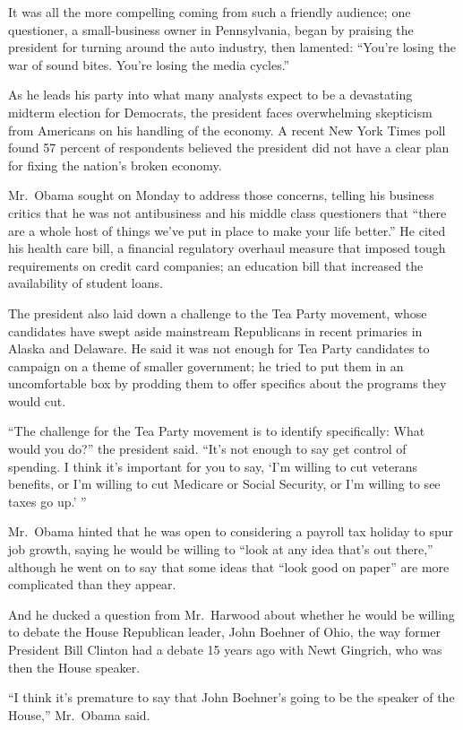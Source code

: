 ﻿\documentclass[12pt]{article}
\begin{document}
It was all the more compelling coming from such a friendly audience; one questioner, a
small-business owner in Pennsylvania, began by praising the president for turning around the auto
industry, then lamented: ``You're losing the war of sound bites. You're losing the media cycles.''

As he leads his party into what many analysts expect to be a devastating midterm election for
Democrats, the president faces overwhelming skepticism from Americans on his handling of the
economy. A recent New York Times poll found 57 percent of respondents believed the president did not
have a clear plan for fixing the nation's broken economy.

Mr.~Obama sought on Monday to address those concerns, telling his business critics that he was not
antibusiness and his middle class questioners that ``there are a whole host of things we've put in
place to make your life better.'' He cited his health care bill, a financial regulatory overhaul
measure that imposed tough requirements on credit card companies; an education bill that increased
the availability of student loans.

The president also laid down a challenge to the Tea Party movement, whose candidates have swept
aside mainstream Republicans in recent primaries in Alaska and Delaware. He said it was not enough
for Tea Party candidates to campaign on a theme of smaller government; he tried to put them in an
uncomfortable box by prodding them to offer specifics about the programs they would cut.

``The challenge for the Tea Party movement is to identify specifically: What would you do?'' the
president said. ``It's not enough to say get control of spending. I think it's important for you to
say, `I'm willing to cut veterans benefits, or I'm willing to cut Medicare or Social Security, or
I'm willing to see taxes go up.' ''

Mr.~Obama hinted that he was open to considering a payroll tax holiday to spur job growth, saying he
would be willing to ``look at any idea that's out there,'' although he went on to say that some
ideas that ``look good on paper'' are more complicated than they appear.

And he ducked a question from Mr.~Harwood about whether he would be willing to debate the House
Republican leader, John Boehner of Ohio, the way former President Bill Clinton had a debate 15 years
ago with Newt Gingrich, who was then the House speaker.

``I think it's premature to say that John Boehner's going to be the speaker of the House,''
Mr.~Obama said.
\end{document}
